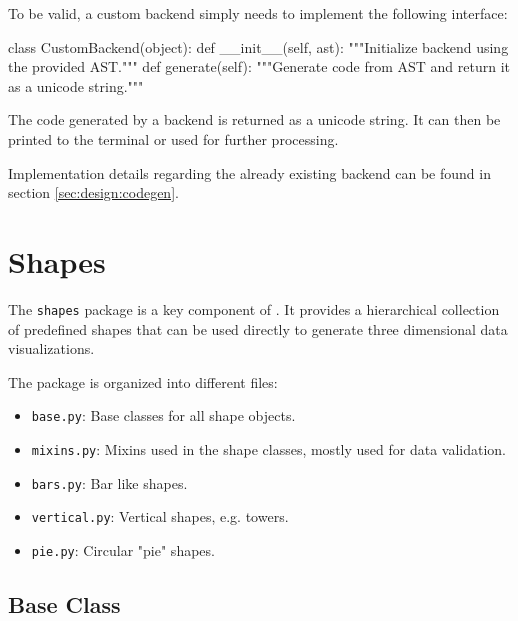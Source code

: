 To be valid, a custom backend simply needs to implement the following interface:

\vspace{.5\baselineskip}
\begin{pythoncode}
class CustomBackend(object):
    def __init__(self, ast):
        """Initialize backend using the provided AST."""
    def generate(self):
        """Generate code from AST and return it
        as a unicode string."""
\end{pythoncode}

\noindent The code generated by a backend is returned as a unicode string. It
can then be printed to the terminal or used for further processing.

Implementation details regarding the already existing backend can be found in
section \ref{sec:design:codegen}.


\section{Shapes}\label{sec:architecture:shapes}

The \texttt{shapes} package is a key component of \tangible{}. It provides a
hierarchical collection of predefined shapes that can be used directly to
generate three dimensional data visualizations.

\vspace{.5\baselineskip}

\noindent The package is organized into different files:

\begin{itemize}
	\item \texttt{base.py}: Base classes for all shape objects.
	\item \texttt{mixins.py}: Mixins used in the shape classes, mostly used for
		data validation.
	\item \texttt{bars.py}: Bar like shapes.
	\item \texttt{vertical.py}: Vertical shapes, e.g. towers.
	\item \texttt{pie.py}: Circular "pie" shapes.
\end{itemize}


\subsection{Base Class}

